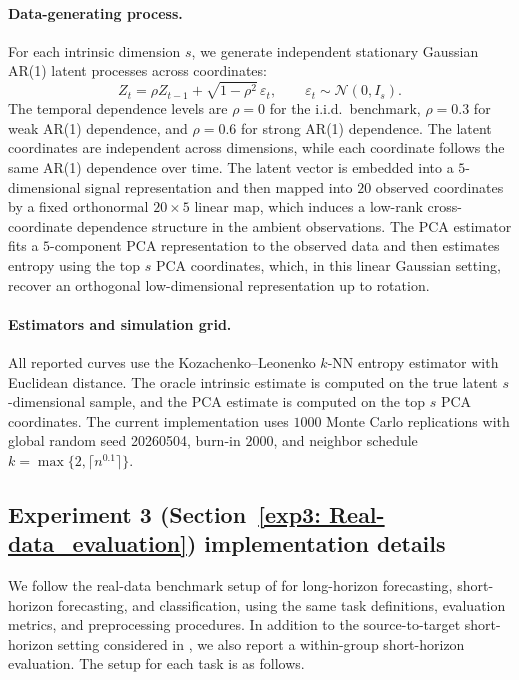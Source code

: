 \documentclass[12pt]{article}
\theoremstyle{definition}
\begin{document}
\paragraph*{Data-generating process.}
For each intrinsic dimension $s$, we generate independent stationary Gaussian AR(1) latent processes across coordinates:
\[
Z_t=\rho Z_{t-1}+\sqrt{1-\rho^2}\,\varepsilon_t,
\qquad \varepsilon_t\sim \mathcal N(0,I_s).
\]
The temporal dependence levels are $\rho=0$ for the i.i.d.\ benchmark, $\rho=0.3$ for weak AR(1) dependence, and $\rho=0.6$ for strong AR(1) dependence. The latent coordinates are independent across dimensions, while each coordinate follows the same AR(1) dependence over time. The latent vector is embedded into a $5$-dimensional signal representation and then mapped into $20$ observed coordinates by a fixed orthonormal $20\times 5$ linear map, which induces a low-rank cross-coordinate dependence structure in the ambient observations. The PCA estimator fits a $5$-component PCA representation to the observed data and then estimates entropy using the top $s$ PCA coordinates, which, in this linear Gaussian setting, recover an orthogonal low-dimensional representation up to rotation.

\paragraph*{Estimators and simulation grid.}
All reported curves use the Kozachenko--Leonenko $k$-NN entropy estimator with Euclidean distance. The oracle intrinsic estimate is computed on the true latent $s$-dimensional sample, and the PCA estimate is computed on the top $s$ PCA coordinates. The current implementation uses $1000$ Monte Carlo replications with global random seed 20260504, burn-in $2000$, and neighbor schedule $k=\max\{2,\lceil n^{0.1}\rceil\}$.

\subsection{Experiment 3 (Section~\ref{exp3: Real-data_evaluation}) implementation details}
\label{Appendix: real_data_implementation details}

We follow the real-data benchmark setup of \cite{goswami2024moment} for long-horizon forecasting, short-horizon forecasting, and classification, using the same task definitions, evaluation metrics, and preprocessing procedures. In addition to the source-to-target short-horizon setting considered in \cite{goswami2024moment}, we also report a within-group short-horizon evaluation. The setup for each task is as follows.
\end{document}

